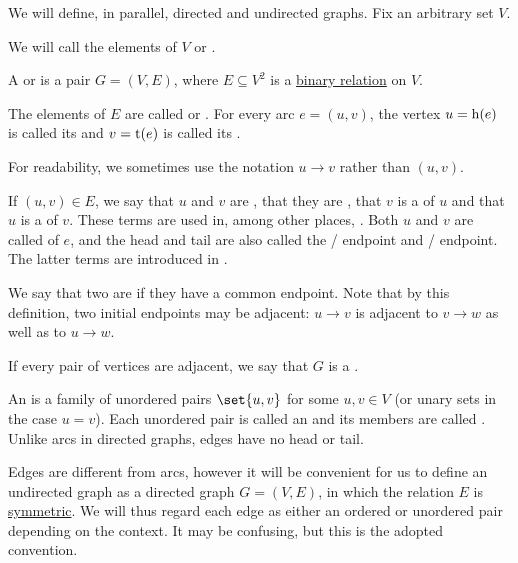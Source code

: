 \begin{definition}\label{def:graph}
  We will define, in parallel, directed and undirected graphs. Fix an arbitrary set \( V \).

  \begin{thmenum}[series=def:graph]
     We will call the elements of \( V \)  or .

     A  or  is a pair \( G = (V, E) \), where \( E \subseteq V^2 \) is a \hyperref[def:binary_relation]{binary relation} on \( V \).

    The elements of \( E \) are called  or . For every arc \( e = (u, v) \), the vertex \( u = \operatorname{h}(e) \) is called its  and \( v = \operatorname{t}(e) \) is called its .

    For readability, we sometimes use the notation \( u \to v \) rather than \( (u, v) \).

     If \( (u, v) \in E \), we say that \( u \) and \( v \) are , that they are , that \( v \) is a  of \( u \) and that \( u \) is a  of \( v \). These terms are used in, among other places, \cite[sec. 5.2]{Erickson2019}. Both \( u \) and \( v \) are called  of \( e \), and the head and tail are also called the / endpoint and / endpoint. The latter terms are introduced in \cite[ch. 1, sec. 1.1]{GondranMinoux1984Graphs}.

    We say that two  are  if they have a common endpoint. Note that by this definition, two initial endpoints may be adjacent: \( u \to v \) is adjacent to \( v \to w \) as well as to \( u \to w \).

    If every pair of vertices are adjacent, we say that \( G \) is a .

     An  is a family of unordered pairs \( \set{ u, v } \) for some \( u, v \in V \) (or unary sets in the case \( u = v \)). Each unordered pair is called an  and its members are called . Unlike arcs in directed graphs, edges have no head or tail.

    Edges are different from arcs, however it will be convenient for us to define an undirected graph as a directed graph \( G = (V, E) \), in which the relation \( E \) is \hyperref[def:binary_relation/symmetric]{symmetric}. We will thus regard each edge as either an ordered or unordered pair depending on the context. It may be confusing, but this is the adopted convention.


\end{thmenum}
\end{definition}
